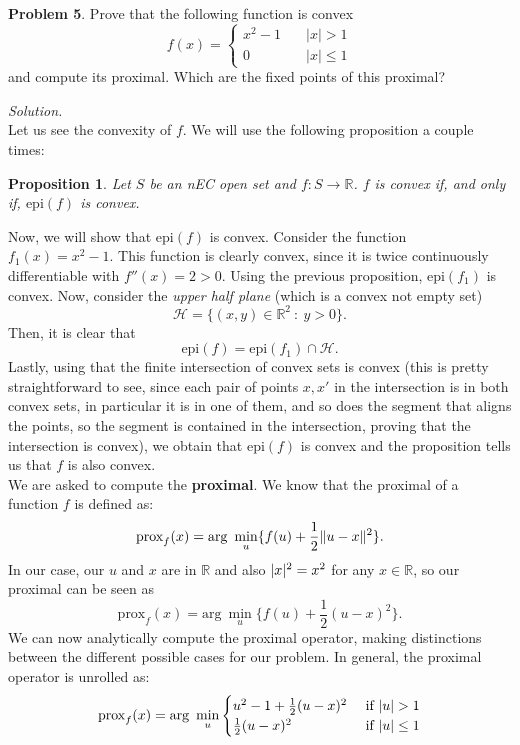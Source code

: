 \documentclass[a4paper]{article}
\DeclarePairedDelimiter\abs{\lvert}{\rvert}%
\DeclarePairedDelimiter\norm{\lVert}{\rVert}%
\newtheorem{nprop}{Proposition}
\newenvironment{problem}[2][Problem]
    { \begin{mdframed}[backgroundcolor=gray!20] \vspace*{0.1cm} \textbf{#1 #2}.}
    {  \end{mdframed}\vspace{0.3cm}}
\newenvironment{solution}
    {\textit{Solution.}\\}
    {}
\newcommand{\R}{\mathbb R}
\begin{document}
\begin{problem}{5}
Prove that the following function is convex
\[
  f(x) =
  \begin{cases}
    x^{2}-1 \quad & |x|>1      \\
    0  \quad      & |x| \leq 1
  \end{cases}
\]
and compute its proximal. Which are the fixed points of this proximal?
\end{problem}
\begin{solution}
  Let us see the convexity of \(f\). We will use the following proposition a couple times:
  \begin{nprop}
    Let \(S\) be an nEC open set and \(f:S\to \R\). \(f\) is convex if, and only if, \(\text{epi}(f)\) is convex.
  \end{nprop}

  Now, we will show that \(\text{epi}(f)\) is convex. Consider the function \(f_1(x) = x^2 - 1\). This function is clearly convex, since it is twice continuously differentiable with \(f''(x) = 2 > 0\). Using the previous proposition, \(\text{epi}(f_1)\) is convex. Now, consider the \emph{upper half plane} (which is a convex not empty set)
  \[
    \mathcal H = \{ (x,y) \in \R^2 \ : \ y > 0\}.
  \]
  Then, it is clear that
  \[
    \text{epi}(f) = \text{epi}(f_1) \cap \mathcal H.
  \]
  Lastly, using that the finite intersection of convex sets is convex (this is pretty straightforward to see, since each pair of points \(x,x'\) in the intersection is in both convex sets, in particular it is in one of them, and so does the segment that aligns the points, so the segment is contained in the intersection, proving that the intersection is convex), we obtain that \(\text{epi}(f)\) is convex and the proposition tells us that \(f\) is also convex.\\

  We are asked to compute the \textbf{proximal}. We know that the proximal of a function \(f\) is defined as:
  \[
    \text{prox}_f(x) = \text{arg}\ \min_u \{f(u) + \frac{1}{2} \norm{u-x}^2\}.
  \]
  In our case, our \(u\) and \(x\) are in \(\R\) and also \(\abs{x}^2 = x^2\) for any \(x\in \R\), so our proximal can be seen as
  \[
    \text{prox}_f(x) = \text{arg}\ \min_u \{f(u) + \frac{1}{2}(u-x)^2\}.
  \]
  We can now analytically compute the proximal operator, making distinctions between the different possible cases for our problem. In general, the proximal operator is unrolled as:
  \begin{equation}\label{ej5:prox}
    \text{prox}_f(x) = \text{arg}\ \min_u \begin{cases}
      u^2 - 1 + \frac{1}{2}(u-x)^2 & \text{ if } \abs{u} > 1    \\
      \frac{1}{2}(u-x)^2           & \text{ if } \abs{u} \leq 1
    \end{cases}
  \end{equation}


\end{solution}
\end{document}
